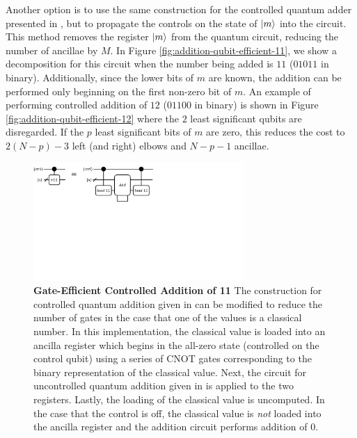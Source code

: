 Another option is to use the same construction for the controlled quantum adder presented in \cite{gidney2018halving}, but to propagate the controls on the state of $\ket{m}$ into the circuit.
This method removes the register $\ket{m}$ from the quantum circuit, reducing the number of ancillae by $M$.
In Figure \ref{fig:addition-qubit-efficient-11}, we show a decomposition for this circuit when the number being added is $11$ ($01011$ in binary).
Additionally, since the lower bits of $m$ are known, the addition can be performed only beginning on the first non-zero bit of $m$.
An example of performing controlled addition of $12$ ($01100$ in binary) is shown in Figure \ref{fig:addition-qubit-efficient-12} where the $2$ least significant qubits are disregarded.
If the $p$ least significant bits of $m$ are zero, this reduces the cost to $2(N - p) - 3$ left (and right) elbows and $N - p - 1$ ancillae.

\begin{figure}
    \centering
    \includegraphics[width=8cm]{figures/ctrl-add-11-gate-efficient.pdf}
    \caption{
        \textbf{Gate-Efficient Controlled Addition of 11}
        The construction for controlled quantum addition given in \cite{gidney2018halving} can be modified to reduce the number of gates in the case that one of the values is a classical number.
        In this implementation, the classical value is loaded into an ancilla register which begins in the all-zero state (controlled on the control qubit) using a series of CNOT gates corresponding to the binary representation of the classical value.
        Next, the circuit for uncontrolled quantum addition given in \cite{gidney2018halving} is applied to the two registers.
        Lastly, the loading of the classical value is uncomputed.
        In the case that the control is off, the classical value is \textit{not} loaded into the ancilla register and the addition circuit performs addition of $0$.
    }
    \label{fig:addition-gate-efficient}
\end{figure}

